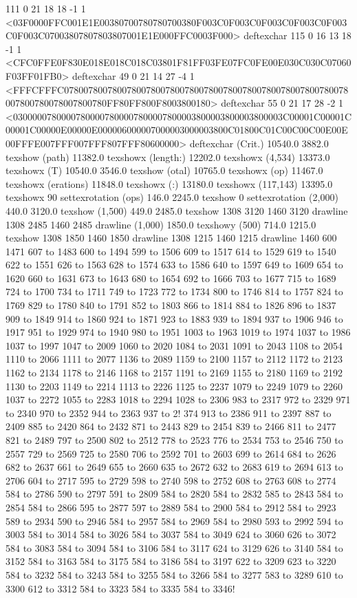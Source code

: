 111 0 21 18 18 -1 1 {{<03F0000FFC001E1E00380700780780700380F003C0F003C0F003C0F003C0F003C0F003C07003807807803807001E1E000FFC0003F000>}} deftexchar
115 0 16 13 18 -1 1 {{<CFC0FFE0F830E018E018C018C03801F81FF03FE07FC0FE00E030C030C07060F03FF01FB0>}} deftexchar
49 0 21 14 27 -4 1 {{<FFFCFFFC07800780078007800780078007800780078007800780078007800780078007800780078007800780FF80FF800F8003800180>}} deftexchar
55 0 21 17 28 -2 1 {{<03000007800007800007800007800007800003800003800003800003C00001C00001C00001C00000E00000E000006000007000003000003800C01800C01C00C00C00E00E00FFFE007FFF007FFF807FFF80600000>}} deftexchar
(Crit.) 10540.0 3882.0 texshow
(path) 11382.0 texshowx
(length:) 12202.0 texshowx
(4,534) 13373.0 texshowx
(T) 10540.0 3546.0 texshow
(otal) 10765.0 texshowx
(op) 11467.0 texshowx
(erations) 11848.0 texshowx
(:) 13180.0 texshowx
(117,143) 13395.0 texshowx
90 settexrotation
(ops) 146.0 2245.0 texshow
0 settexrotation
(2,000) 440.0 3120.0 texshow
(1,500) 449.0 2485.0 texshow
1308 3120 1460 3120 drawline
1308 2485 1460 2485 drawline
(1,000) 1850.0 texshowy
(500) 714.0 1215.0 texshow
1308 1850 1460 1850 drawline
1308 1215 1460 1215 drawline
1460 600 1471 607 to 1483 600 to 1494 599 to 1506 609 to 1517 614 to 1529 619 to 1540 622 to 1551 626 to 1563 628 to 1574 633 to 1586 640 to 1597 649 to 1609 654 to 1620 660 to 1631 673 to 1643 680 to 1654 692 to 1666 703 to 1677 715 to 1689 724 to 1700 734 to 1711 749 to 1723 772 to 1734 800 to 1746 814 to 1757 824 to 1769 829 to 1780 840 to 1791 852 to 1803 866 to 1814 884 to 1826 896 to 1837 909 to 1849 914 to 1860 924 to 1871 923 to 1883 939 to 1894 937 to 1906 946 to 1917 951 to 1929 974 to 1940 980 to 1951 1003 to 1963 1019 to 1974 1037 to 1986 1037 to 1997 1047 to 2009 1060 to 2020 1084 to 2031 1091 to 2043 1108 to 2054 1110 to 2066 1111 to 2077 1136 to 2089 1159 to 2100 1157 to 2112 1172 to 2123 1162 to 2134 1178 to 2146 1168 to 2157 1191 to 2169 1155 to 2180 1169 to 2192 1130 to 2203 1149 to 2214 1113 to 2226 1125 to 2237 1079 to 2249 1079 to 2260 1037 to 2272 1055 to 2283 1018 to 2294 1028 to 2306 983 to 2317 972 to 2329 971 to 2340 970 to 2352 944 to 2363 937 to 2!
374 913 to 2386 911 to 2397 887 to
 2409 885 to 2420 864 to 2432 871 to 2443 829 to 2454 839 to 2466 811 to 2477 821 to 2489 797 to 2500 802 to 2512 778 to 2523 776 to 2534 753 to 2546 750 to 2557 729 to 2569 725 to 2580 706 to 2592 701 to 2603 699 to 2614 684 to 2626 682 to 2637 661 to 2649 655 to 2660 635 to 2672 632 to 2683 619 to 2694 613 to 2706 604 to 2717 595 to 2729 598 to 2740 598 to 2752 608 to 2763 608 to 2774 584 to 2786 590 to 2797 591 to 2809 584 to 2820 584 to 2832 585 to 2843 584 to 2854 584 to 2866 595 to 2877 597 to 2889 584 to 2900 584 to 2912 584 to 2923 589 to 2934 590 to 2946 584 to 2957 584 to 2969 584 to 2980 593 to 2992 594 to 3003 584 to 3014 584 to 3026 584 to 3037 584 to 3049 624 to 3060 626 to 3072 584 to 3083 584 to 3094 584 to 3106 584 to 3117 624 to 3129 626 to 3140 584 to 3152 584 to 3163 584 to 3175 584 to 3186 584 to 3197 622 to 3209 623 to 3220 584 to 3232 584 to 3243 584 to 3255 584 to 3266 584 to 3277 583 to 3289 610 to 3300 612 to 3312 584 to 3323 584 to 3335 584 to 3346!
